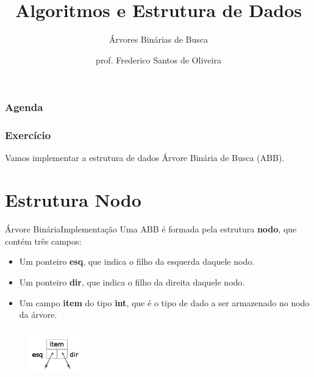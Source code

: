 \documentclass[aspectratio=169]{beamer}
\title[Aula Prática - Árvores Binárias de Busca]{Algoritmos e Estrutura de Dados}
\subtitle{Árvores Binárias de Busca}
\author[Frederico Santos de Oliveira]{prof. Frederico Santos de Oliveira}
\institute[UFMT]{Universidade Federal de Mato Grosso\\ Faculdade de Engenharia}
\date{}
\begin{document}
\begin{frame}[plain]
  \titlepage
\end{frame}


\begin{frame}
  \frametitle{Agenda}
  \tableofcontents
\end{frame}


\begin{frame}
\frametitle{Exercício}
Vamos implementar a estrutura de dados Árvore Binária de Busca (ABB).
\end{frame}

\section{Estrutura Nodo}

\begin{frame}{Árvore Binária}{Implementação}
Uma ABB é formada pela estrutura {\bf nodo}, que contém três campos:
\begin{itemize}
 \item Um ponteiro {\bf esq}, que indica o filho da esquerda daquele nodo.
 \item Um ponteiro {\bf dir}, que indica o filho da direita daquele nodo.
 \item Um campo {\bf item} do tipo {\bf int}, que é o tipo de dado a ser armazenado no nodo da árvore.
\end{itemize}
\begin{figure}[!h]
  \centering
  \includegraphics[width=70pt]{imagens/nodo.png}
  \label{fig_nodo}
\end{figure}
\end{frame}

\end{document}

